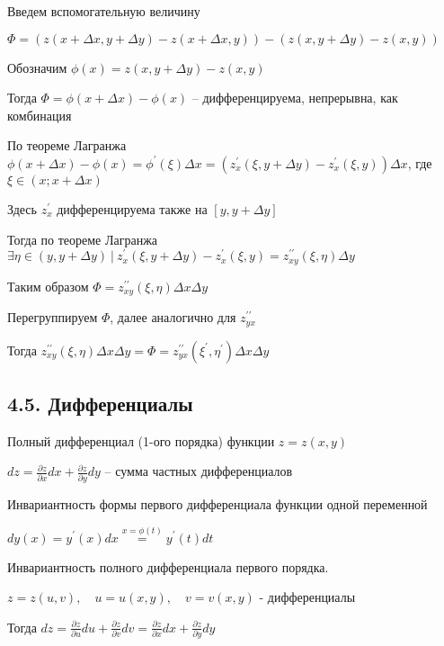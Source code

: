 \documentclass[12pt]{article}
\begin{document}
    \begin{MyProof}
        Введем вспомогательную величину

        $\displaystyle \Phi = (z(x + \Delta x, y + \Delta y) - z(x + \Delta x, y)) - (z(x, y + \Delta y) - z(x, y))$

        Обозначим $\displaystyle \phi(x) = z(x, y + \Delta y) - z(x, y)$

        Тогда $\displaystyle \Phi = \phi(x + \Delta x) - \phi(x)$ -- дифференцируема, непрерывна, как комбинация

        По теореме Лагранжа $\displaystyle \phi(x + \Delta x) - \phi(x) = \phi^\prime(\xi) \Delta x = (z^\prime_x(\xi, y + \Delta y) - z^\prime_x(\xi, y)) \Delta x$, где $\displaystyle \xi \in (x; x + \Delta x)$

        Здесь $\displaystyle z^\prime_x$ дифференцируема также на $\displaystyle [y, y + \Delta y]$


        Тогда по теореме Лагранжа $\displaystyle \exists \eta \in (y, y + \Delta y) \ | \ z^\prime_x(\xi, y + \Delta y) - z^\prime_x(\xi, y) = z^{\prime\prime}_{xy} (\xi, \eta) \Delta y$

        Таким образом $\displaystyle \Phi = z^{\prime\prime}_{xy} (\xi, \eta) \Delta x \Delta y$

        Перегруппируем $\displaystyle \Phi$, далее аналогично для $\displaystyle z^{\prime\prime}_{yx}$

        Тогда $\displaystyle z^{\prime\prime}_{xy} (\xi, \eta) \Delta x \Delta y = \Phi = z^{\prime\prime}_{yx} (\xi^\prime, \eta^\prime) \Delta x \Delta y$
    \end{MyProof}

    \subsection{4.5. Дифференциалы}
    
    \hypertarget{completedifferentialoffunctionoftwovariables}{}
     Полный дифференциал (1-ого порядка) функции $\displaystyle z = z(x, y)$

    $\displaystyle dz = \frac{\partial z}{\partial x} dx + \frac{\partial z}{\partial y} dy$ -- сумма частных дифференциалов

     Инвариантность формы первого дифференциала функции одной переменной

    $\displaystyle dy(x) = y^\prime(x)dx \stackrel{x = \phi(t)}{=} y^\prime(t)dt$

    \hypertarget{invariantofdifferentialoffunctionoftwovariables}{}
    \begin{MyTheorem}
        \Ths Инвариантность полного дифференциала первого порядка.

        $\displaystyle z = z(u, v), \quad u = u(x, y), \quad v = v(x, y)$ - дифференциалы

        Тогда $\displaystyle dz = \frac{\partial z}{\partial u}du + \frac{\partial z}{\partial v} dv = \frac{\partial z}{\partial x} dx + \frac{\partial z}{\partial y} dy$
    \end{MyTheorem}
\end{document}
